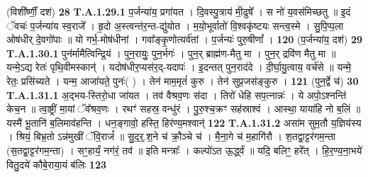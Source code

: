 \documentclass[17pt]{extarticle}
\begin{document}
                  \newline
                                                        (विशी᳚र्ष्णीं॒ दश॑) \textbf{28} \newline \newline
                                \textbf{ T.A.1.29.1} \newline
                  प॒र्जन्या॑य॒ प्रगा॑यत । दि॒वस्पु॒त्राय॑ मी॒ढुषे᳚ । स नो॑ य॒वस॑मिच्छतु ॥ इ॒दं ॅवचः॑ प॒र्जन्या॑य स्व॒राजे᳚ । हृ॒दो अ॒स्त्वन्त॑र॒न्त-द्यु॑योत ।  म॒यो॒भूर्वातो॑ वि॒श्वकृ॑ष्टयः सन्त्व॒स्मे । सु॒पि॒प्प॒ला ओष॑धीर् दे॒वगो॑पाः ॥  यो गर्भ॒-मोष॑धीनां । गवा᳚ङ्कृ॒णोत्यर्व॑तां । प॒र्जन्यः॑ पुरु॒षीणां᳚ । \textbf{ 120} \newline
                  \newline
                                                        (प॒र्जन्या॑य॒ दश॑) \textbf{29} \newline \newline
                                \textbf{ T.A.1.30.1} \newline
                  पुन॑र्मामैत्विन्द्रि॒यं । पुन॒रायुः॒ पुन॒र्भगः॑ । पुन॒र् ब्राह्म॑ण-मैतु मा । पुन॒र् द्रवि॑ण मैतु मा ॥ यन्मे॒ऽद्य रेतः॑ पृथि॒वीमस्कान्॑ ।  यदोष॑धीर॒प्यस॑र॒द्-यदापः॑ । इ॒दन्तत् पुन॒राद॑दे । दी॒र्घा॒यु॒त्वाय॒ वर्च॑से ॥ यन्मे॒ रेतः॒ प्रसि॑च्यते । यन्म॒ आजा॑यते॒ पुनः॑( ) । तेन॑ माम॒मृतं॑ कुरु । तेन॑ सुप्र॒जस॑ङ्कुरु । \textbf{ 121} \newline
                  \newline
                                                        (पुन॒र्द्वे च॑) \textbf{30} \newline \newline
                                \textbf{ T.A.1.31.1} \newline
                  अ॒द्भय-स्तिरो॒धा जा॑यत । तव॑ वैश्रव॒णः स॑दा । तिरो॑ धेहि सप॒त्नान्नः॑ । ये अपो॒ऽश्नन्ति॑ केच॒न ॥ त्वा॒ष्ट्रीं मा॒यां ॅव᳚श्रव॒णः ।  रथꣳ॑ सहस्र॒ वन्धु॑रं । पु॒रु॒श्च॒क्रꣳ सह॑स्राश्वं । आस्था॒ याया॑हि नो ब॒लिं ॥ यस्मै॑ भू॒तानि॑ ब॒लिमाव॑हन्ति । धन॒ङ्गावो॒ हस्ति॒ हिर॑ण्य॒मश्वान्॑ \textbf{ 122} \newline
                  \newline
                                                                  \textbf{ T.A.1.31.2} \newline
                  असा॑म सुम॒तौ य॒ज्ञिय॑स्य । श्रियं॒ बिभ्र॒तो ऽन्न॑मुखीं ॅवि॒राजं᳚ ॥ सु॒द॒र्॒.श॒ने च॑ क्रौ॒ञ्चे च॑ । मै॒ना॒गे च॑ म॒हागि॑रौ । श॒तद्वा॒ट्टर॑गम॒न्ता (स॒तद्वा॒ट्टर॑गम॒न्ता) ।  सꣳ॒॒हार्यं॒ नग॑रं॒ तव॑ ॥  इति मन्त्राः᳚ । कल्पो॑ऽत ऊ॒र्द्ध्वं ॥  यदि॒ बलिꣳ॒॒ हरे᳚त् । हि॒र॒ण्य॒ना॒भये॑ वितु॒दये॑ कौबे॒राया॒यं ब॑लिः \textbf{ 123} \newline
\end{document}
